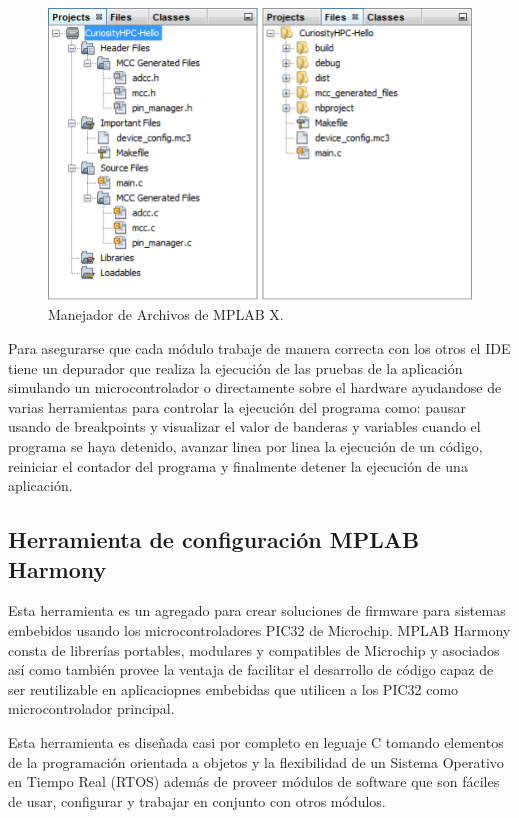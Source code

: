 \documentclass[letterpaper,12pt,oneside]{book}
\begin{document}
		\begin{figure}[!htpb]
			\centering
			\includegraphics[scale = 0.8]{Material de Consulta/ProjMan.PNG}
			\caption[Manejador de Archivos]{Manejador de Archivos de MPLAB X.}
			\label{ProjMan}
		\end{figure}

		Para asegurarse que cada módulo trabaje de manera correcta con los otros el IDE tiene un depurador que realiza la ejecución de las pruebas de la aplicación simulando un microcontrolador o directamente sobre el hardware ayudandose de varias herramientas para controlar la ejecución del programa como: pausar usando de breakpoints y visualizar el valor de banderas y variables cuando el programa se haya detenido, avanzar linea por linea la ejecución de un código, reiniciar el contador del programa y finalmente detener la ejecución de una aplicación.

			\subsection{Herramienta de configuración MPLAB Harmony}
			Esta herramienta es un agregado para crear soluciones de firmware para sistemas embebidos usando los microcontroladores PIC32 de Microchip. MPLAB Harmony consta de librerías portables, modulares y compatibles de Microchip y asociados así como también provee la ventaja de facilitar el desarrollo de código capaz de ser reutilizable en aplicaciopnes embebidas que utilicen a los PIC32 como microcontrolador principal.

			Esta herramienta es diseñada casi por completo en leguaje C tomando elementos de la programación orientada a objetos y la flexibilidad de un Sistema Operativo en Tiempo Real (RTOS) además de proveer módulos de software que son fáciles de usar, configurar y trabajar en conjunto con otros módulos.
\end{document}
